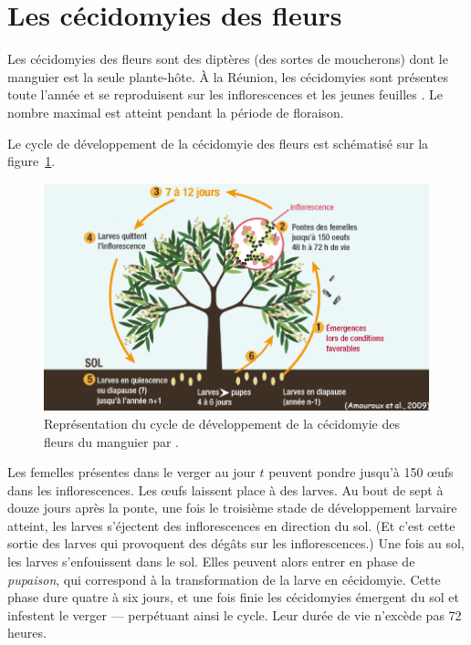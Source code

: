 \section{Les cécidomyies des fleurs}

Les cécidomyies des fleurs sont des diptères (des sortes de moucherons) dont le manguier est la seule plante-hôte.
À la Réunion, les cécidomyies sont présentes toute l'année et se reproduisent sur les inflorescences et les jeunes feuilles \citep{paul}.
Le nombre maximal est atteint pendant la période de floraison.


Le cycle de développement de la cécidomyie des fleurs est schématisé sur la figure~\ref{fig:cycle}.
%
\begin{figure}
 \centering
 \includegraphics[scale = 0.6]{laurie/Cycle_cecido.PNG}
 \caption{Représentation du cycle de développement de la cécidomyie des fleurs du manguier par \citet{paulguide}.}
 \label{fig:cycle}
\end{figure}
%
Les femelles présentes dans le verger au jour $t$ peuvent pondre jusqu'à 150 œufs dans les inflorescences.
Les œufs laissent place à des larves.
Au bout de sept à douze jours après la ponte, une fois le troisième stade de développement larvaire atteint, les larves s'éjectent des inflorescences en direction du sol.
(Et c'est cette sortie des larves qui provoquent des dégâts sur les inflorescences.)
Une fois au sol, les larves s'enfouissent dans le sol. Elles peuvent alors entrer en phase de \emph{pupaison}, qui correspond à la transformation de la larve en cécidomyie.
Cette phase dure quatre à six jours, et une fois finie les cécidomyies émergent du sol et infestent le verger --- perpétuant ainsi le cycle. 
Leur durée de vie n'excède pas 72 heures.

